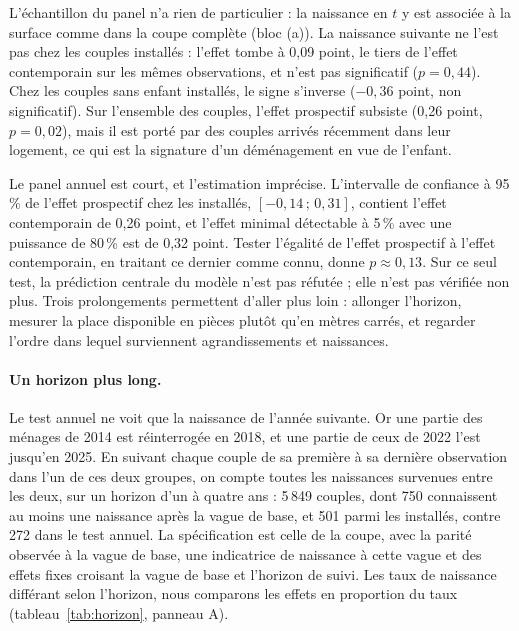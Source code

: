 \documentclass[11pt,a4paper]{article}
\theoremstyle{plain}
\theoremstyle{definition}
\theoremstyle{remark}
\begin{document}
L'échantillon du panel n'a rien de particulier : la naissance en $t$ y est associée à la surface comme dans la coupe complète (bloc (a)). La naissance suivante ne l'est pas chez les couples installés : l'effet tombe à 0,09 point, le tiers de l'effet contemporain sur les mêmes observations, et n'est pas significatif ($p = 0{,}44$). Chez les couples sans enfant installés, le signe s'inverse ($-0{,}36$ point, non significatif). Sur l'ensemble des couples, l'effet prospectif subsiste (0,26 point, $p = 0{,}02$), mais il est porté par des couples arrivés récemment dans leur logement, ce qui est la signature d'un déménagement en vue de l'enfant.

Le panel annuel est court, et l'estimation imprécise. L'intervalle de confiance à 95\,\% de l'effet prospectif chez les installés, $[-0{,}14\,;\,0{,}31]$, contient l'effet contemporain de 0,26 point, et l'effet minimal détectable à 5\,\% avec une puissance de 80\,\% est de 0,32 point. Tester l'égalité de l'effet prospectif à l'effet contemporain, en traitant ce dernier comme connu, donne $p \approx 0{,}13$. Sur ce seul test, la prédiction centrale du modèle n'est pas réfutée ; elle n'est pas vérifiée non plus. Trois prolongements permettent d'aller plus loin : allonger l'horizon, mesurer la place disponible en pièces plutôt qu'en mètres carrés, et regarder l'ordre dans lequel surviennent agrandissements et naissances.

\paragraph{Un horizon plus long.} Le test annuel ne voit que la naissance de l'année suivante. Or une partie des ménages de 2014 est réinterrogée en 2018, et une partie de ceux de 2022 l'est jusqu'en 2025. En suivant chaque couple de sa première à sa dernière observation dans l'un de ces deux groupes, on compte toutes les naissances survenues entre les deux, sur un horizon d'un à quatre ans : 5\,849 couples, dont 750 connaissent au moins une naissance après la vague de base, et 501 parmi les installés, contre 272 dans le test annuel. La spécification est celle de la coupe, avec la parité observée à la vague de base, une indicatrice de naissance à cette vague et des effets fixes croisant la vague de base et l'horizon de suivi. Les taux de naissance différant selon l'horizon, nous comparons les effets en proportion du taux (tableau~\ref{tab:horizon}, panneau A).
\end{document}
